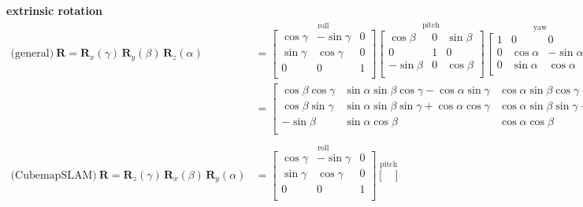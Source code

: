 \textbf{extrinsic rotation} \\
\begin{align}
\text{(general)} \
  \textbf{R} = \textbf{R}_x(\gamma) \, \textbf{R}_y(\beta) \, \textbf{R}_z(\alpha) &=
  \overset{\text{roll}}
  {\begin{bmatrix}
    \cos \gamma & -\sin \gamma & 0 \\
    \sin \gamma &  \cos \gamma & 0 \\
     0          &   0          & 1 \\
  \end{bmatrix}}
  \overset{\text{pitch}}
  {\begin{bmatrix}
    \cos \beta & 0 & \sin \beta \\
     0         & 1 &  0 \\
   -\sin \beta & 0 & \cos \beta \\
  \end{bmatrix}}
  \overset{\text{yaw}}
  {\begin{bmatrix}
    1 &  0          &   0 \\
    0 & \cos \alpha & -\sin \alpha \\
    0 & \sin \alpha &  \cos \alpha \\
  \end{bmatrix}} \\
  &= \begin{bmatrix}
    \cos\beta\cos\gamma & \sin\alpha\sin\beta\cos\gamma - \cos\alpha\sin\gamma & \cos\alpha\sin\beta\cos\gamma + \sin\alpha\sin\gamma \\
    \cos\beta\sin\gamma & \sin\alpha\sin\beta\sin\gamma + \cos\alpha\cos\gamma & \cos\alpha\sin\beta\sin\gamma - \sin\alpha\cos\gamma \\
    -\sin\beta          & \sin\alpha\cos\beta                                  & \cos\alpha\cos\beta \\
  \end{bmatrix}
\\
\\
\text{(CubemapSLAM)} \
  \textbf{R} = \textbf{R}_z(\gamma) \, \textbf{R}_x(\beta) \, \textbf{R}_y(\alpha) &=
  \overset{\text{roll}}
  {\begin{bmatrix}
    \cos \gamma & -\sin \gamma & 0 \\
    \sin \gamma &  \cos \gamma & 0 \\
     0          &   0          & 1 \\
  \end{bmatrix}}
  \overset{\text{pitch}}
  {\begin{bmatrix}

\end{bmatrix}}
\end{align}
